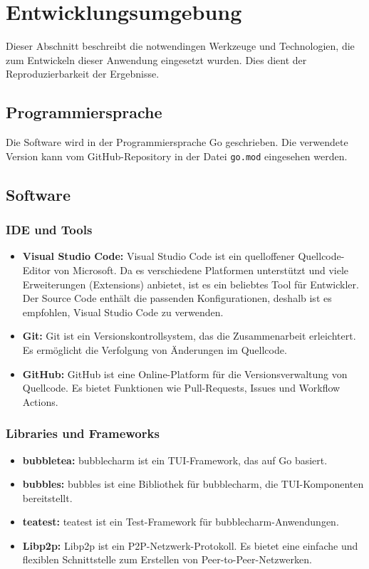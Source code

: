 \newpage
\section{Entwicklungsumgebung}

Dieser Abschnitt beschreibt die notwendingen Werkzeuge und Technologien, die zum Entwickeln dieser Anwendung eingesetzt wurden.
Dies dient der Reproduzierbarkeit der Ergebnisse. 


\subsection{Programmiersprache}

Die Software wird in der Programmiersprache Go geschrieben.
Die verwendete Version kann vom GitHub-Repository in der Datei \texttt{go.mod} eingesehen werden.


\subsection{Software}


\subsubsection{IDE und Tools}

\begin{itemize}
    \item \textbf{Visual Studio Code:} Visual Studio Code ist ein quelloffener Quellcode-Editor von Microsoft. Da es verschiedene Platformen unterstützt und viele Erweiterungen (Extensions) anbietet, ist es ein beliebtes Tool für Entwickler. Der Source Code enthält die passenden Konfigurationen, deshalb ist es empfohlen, Visual Studio Code zu verwenden.
    \item \textbf{Git:} Git ist ein Versionskontrollsystem, das die Zusammenarbeit erleichtert. Es ermöglicht die Verfolgung von Änderungen im Quellcode.
    \item \textbf{GitHub:} GitHub ist eine Online-Platform für die Versionsverwaltung von Quellcode. Es bietet Funktionen wie Pull-Requests, Issues und Workflow Actions.
\end{itemize}


\subsubsection{Libraries und Frameworks}

\begin{itemize}
    \item \textbf{bubbletea:} bubblecharm ist ein TUI-Framework, das auf Go basiert. \cite{bubbletea}
    \item \textbf{bubbles:} bubbles ist eine Bibliothek für bubblecharm, die TUI-Komponenten bereitstellt. \cite{bubbles}
    \item \textbf{teatest:} teatest ist ein Test-Framework für bubblecharm-Anwendungen. \cite{teatest_docs}
    \item \textbf{Libp2p:} Libp2p ist ein P2P-Netzwerk-Protokoll. Es bietet eine einfache und flexiblen Schnittstelle zum Erstellen von Peer-to-Peer-Netzwerken. \cite{libp2p_go_getting_started}
\end{itemize}

